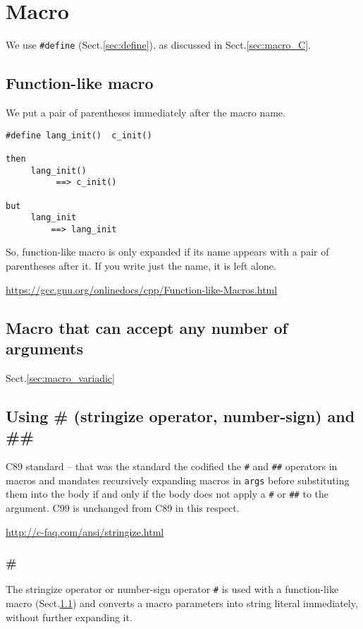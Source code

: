 \chapter{Macro}
\label{chap:macro}


We use \verb!#define! (Sect.\ref{sec:define}),
as discussed in Sect.\ref{sec:macro_C}.

\section{Function-like macro}
\label{sec:function-like-macro}

We put a pair of parentheses immediately after the macro name.

\begin{verbatim}
#define lang_init()  c_init()

then
     lang_init()
          ==> c_init()

but  
     lang_init
         ==> lang_init
\end{verbatim}
So,   function-like macro is only expanded if its name appears with a pair of
parentheses after it. If you write just the name, it is left alone.

\url{https://gcc.gnu.org/onlinedocs/cpp/Function-like-Macros.html}


\section{Macro that can accept any number of arguments}


Sect.\ref{sec:macro_variadic}

\section{Using \# (stringize operator, number-sign) and \#\#}


C89 standard -- that was the standard the codified the \verb!#! and \verb!##!
operators in macros and mandates recursively expanding macros in \verb!args!
before substituting them into the body if and only if the body does not apply a
\verb!#! or \verb!##! to the argument. C99 is unchanged from C89 in this
respect.

\url{http://c-faq.com/ansi/stringize.html}

\subsection{\#}

The stringize operator or number-sign operator \verb!#! is used with a
function-like macro (Sect.\ref{sec:function-like-macro}) and converts a macro
parameters into string literal immediately, without further expanding it.

